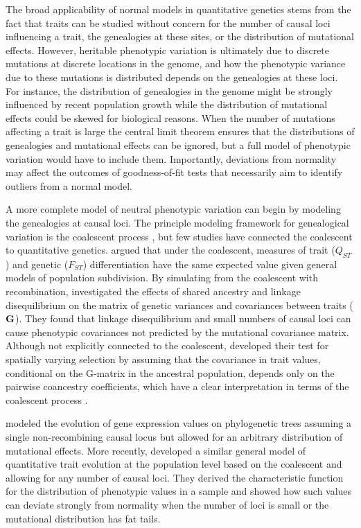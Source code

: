 The broad applicability of normal models in quantitative genetics stems from the
fact that traits can be studied without concern for the number of causal loci
influencing a trait, the genealogies at these sites, or the distribution of
mutational effects. However, heritable phenotypic variation is ultimately due to
discrete mutations at discrete locations in the genome, and how the phenotypic
variance due to these mutations is distributed depends on the genealogies at
these loci. For instance, the distribution of genealogies in the genome might be
strongly influenced by recent population growth while the distribution of
mutational effects could be skewed for biological reasons. When the number of
mutations affecting a trait is large the central limit theorem ensures that the
distributions of genealogies and mutational effects can be ignored, but a full
model of phenotypic variation would have to include them. Importantly,
deviations from normality may affect the outcomes of goodness-of-fit tests that
necessarily aim to identify outliers from a normal model.

A more complete model of neutral phenotypic variation can begin by modeling the
genealogies at causal loci. The principle modeling framework for genealogical
variation is the coalescent process \citep{Wakeley2008}, but few studies have
connected the coalescent to quantitative genetics. \citet{Whitlock1999} argued
that under the coalescent, measures of trait ($Q_{ST}$) and genetic ($F_{ST}$)
differentiation have the same expected value given general models of population
subdivision. By simulating from the coalescent with recombination,
\citet{Griswold2007} investigated the effects of shared ancestry and linkage
disequilibrium on the matrix of genetic variances and covariances between traits
($\mbox{\textbf{G}}$). They found that linkage disequilibrium and small numbers
of causal loci can cause phenotypic covariances not predicted by the mutational
covariance matrix. Although not explicitly connected to the coalescent,
\citet{Ovaskainen2011} developed their test for spatially varying selection by
assuming that the covariance in trait values, conditional on the G-matrix in the
ancestral population, depends only on the pairwise coancestry coefficients,
which have a clear interpretation in terms of the coalescent process
\citep{Slatkin1991}.

\citet{Khaitovich2005} modeled the evolution of gene expression values on
phylogenetic trees assuming a single non-recombining causal locus but allowed
for an arbitrary distribution of mutational effects. More
recently, \citet{Schraiber2015} developed a similar general model of
quantitative trait evolution at the population level based on the coalescent and
allowing for any number of causal loci. They derived the characteristic function
for the distribution of phenotypic values in a sample and showed how such values
can deviate strongly from normality when the number of loci is small or the
mutational distribution has fat tails.

